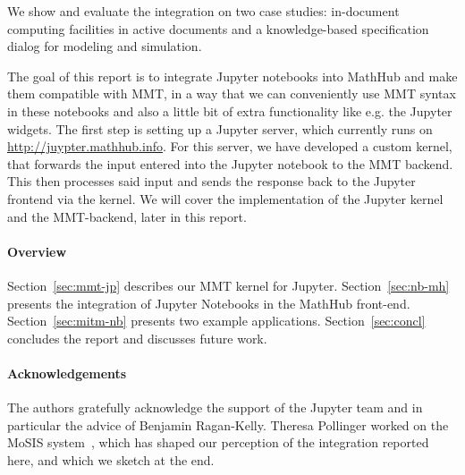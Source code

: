 We show and evaluate the integration on two case studies: in-document computing facilities in active documents and a knowledge-based specification dialog for modeling and simulation. 

The goal of this report is to integrate Jupyter notebooks into MathHub
and make them compatible with MMT, in a way that we can conveniently use 
MMT syntax in these notebooks and also a little bit of extra functionality
like e.g. the Jupyter widgets. The first step is setting up a Jupyter server,
which currently runs on \url{http://juypter.mathhub.info}. 
For this server, we have developed a custom kernel, that forwards the input 
entered into the Jupyter notebook to the MMT backend. This then processes 
said input and sends the response back to the Jupyter frontend via the kernel.
We will cover the implementation of the Jupyter kernel and the MMT-backend,
later in this report.


\paragraph{Overview}
Section~\ref{sec:mmt-jp} describes our MMT kernel for Jupyter.
Section~\ref{sec:nb-mh} presents the integration of Jupyter Notebooks in the MathHub front-end.
Section~\ref{sec:mitm-nb} presents two example applications.
Section~\ref{sec:concl} concludes the report and discusses future work.

\paragraph{Acknowledgements}
The authors gratefully acknowledge the support of the Jupyter team and in particular the advice of Benjamin Ragan-Kelly.
Theresa Pollinger worked on the MoSIS system~\cite{PolKohKoe:kacse18}, which has shaped our perception of the integration reported here, and which we sketch at the end. 

